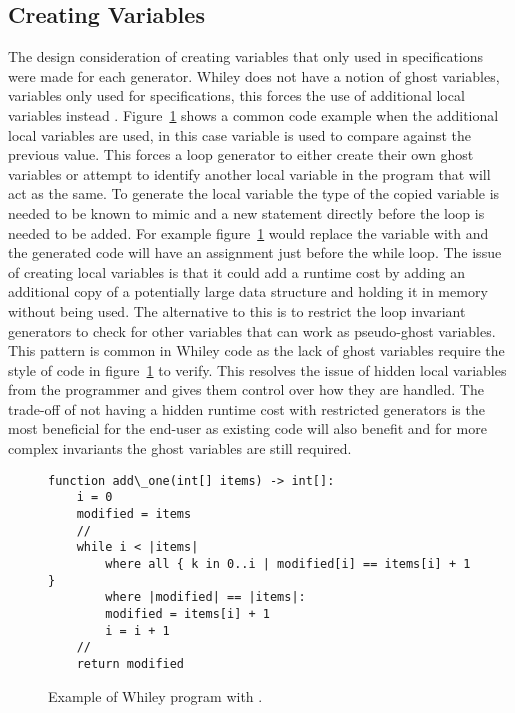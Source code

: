 \subsection{Creating Variables}
%

The design consideration of creating variables that only used in specifications
were made for each generator.
Whiley does not have a notion of ghost variables, variables only used for
specifications, this forces the use of additional local variables instead \cite{whiley-origin}.
Figure~\ref{lst:vars} shows a common code example when the additional local
variables are used, in this case  variable is used to compare
against the previous value.
This forces a loop generator to either create their own ghost variables or
attempt to identify another local variable in the program that will act as the
same.
To generate the local variable the type of the copied variable is needed to be
known to mimic and a new statement directly before the loop is needed to be
added.
For example figure~\ref{lst:vars} would replace the  variable
with  and the generated code will have an assignment just before
the while loop.
The issue of creating local variables is that it could add a runtime cost by
adding an additional copy of a potentially large data structure
and holding it in memory without being used.
The alternative to this is to restrict the loop invariant generators to check
for other variables that can work as pseudo-ghost variables.
This pattern is common in Whiley code as the lack of ghost variables require
the style of code in figure~\ref{lst:vars} to verify. 
This resolves the issue of hidden local variables from the programmer
and gives them control over how they are handled.
The trade-off of not having a hidden runtime cost with restricted generators
is the most beneficial for the end-user as existing code will also benefit
and for more complex invariants the ghost variables are still required.

\begin{figure}[ht]
\begin{lstlisting}
function add\_one(int[] items) -> int[]:
    i = 0
    modified = items
    //
    while i < |items|
        where all { k in 0..i | modified[i] == items[i] + 1 }
        where |modified| == |items|:
        modified = items[i] + 1
        i = i + 1
    //
    return modified
\end{lstlisting}
    \label{lst:vars}
    \caption{Example of Whiley program with  .}
\end{figure}


